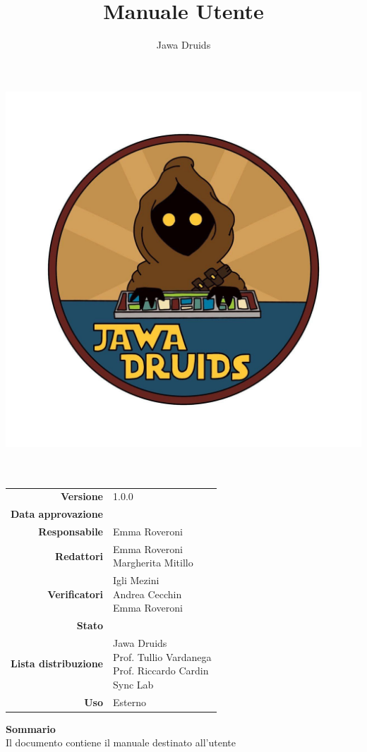 



	
	\makeatletter
	\begin{titlepage}
		\begin{center}
			\vspace*{-4cm}
			\author{Jawa Druids} 
			\title{Manuale Utente}
			\date{} %
			\includegraphics[width=0.5\linewidth]{../immagini/DRUIDSLOGO.jpg}\\[4ex]
			{\huge \bfseries  \@title }\\[2ex] 
			{\LARGE  \@author}\\[50ex]
			\vspace*{-9cm}
			\begin{table}[H]
				\renewcommand{\arraystretch}{1.4}
				\centering
				\begin{tabular}{r | l}
					\textbf{Versione} & 1.0.0 \\%
					\textbf{Data approvazione} & \\
					\textbf{Responsabile} & Emma Roveroni\\
					\textbf{Redattori} & \makecell[tl]{ Emma Roveroni \\ Margherita Mitillo} \\
					\textbf{Verificatori} & \makecell[tl]{Igli Mezini \\ Andrea Cecchin \\ Emma Roveroni} \\
					\textbf{Stato} & \\
					\textbf{Lista distribuzione} & \makecell[tl]{Jawa Druids \\ Prof. Tullio Vardanega \\ Prof. Riccardo Cardin \\ Sync Lab}\\
					\textbf{Uso} & Esterno  
				\end{tabular}
			\end{table}
			\vspace{0.1cm}
			\hfill \break
			\fontsize{17}{10}\textbf{Sommario} \\
			\vspace{0.1cm}
			Il documento contiene il manuale destinato all'utente
		\end{center}
	\end{titlepage}
	\makeatother
	
	
	\tableofcontents{}
	\listoffigures
	\listoftables	
	
	
	
	
	
	

